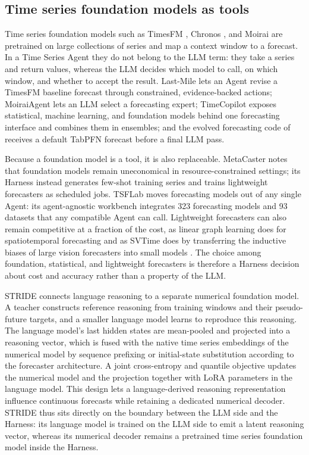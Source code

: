 \documentclass[preprints,article,submit,moreauthors]{Definitions/mdpi}
\begin{document}
\subsection{Time series foundation models as tools}
\label{sec:llm-tsfm}

Time series foundation models such as TimesFM \citep{das2024timesfm}, Chronos \citep{ansari2024chronos}, and Moirai \citep{woo2024moirai} are pretrained on large collections of series and map a context window to a forecast. In a Time Series Agent they do not belong to the LLM term: they take a series and return values, whereas the LLM decides which model to call, on which window, and whether to accept the result. Last-Mile \citep{lastmile2026} lets an Agent revise a TimesFM baseline forecast through constrained, evidence-backed actions; MoiraiAgent \citep{moiraiagent2026} lets an LLM select a forecasting expert; TimeCopilot \citep{timecopilot2025} exposes statistical, machine learning, and foundation models behind one forecasting interface and combines them in ensembles; and the evolved forecasting code of \citet{promptevolutionforecast2026} receives a default TabPFN forecast before a final LLM pass.

Because a foundation model is a tool, it is also replaceable. MetaCaster \citep{metacaster2026} notes that foundation models remain uneconomical in resource-constrained settings; its Harness instead generates few-shot training series and trains lightweight forecasters as scheduled jobs. TSFLab \citep{tsflab2026} moves forecasting models out of any single Agent: its agent-agnostic workbench integrates 323 forecasting models and 93 datasets that any compatible Agent can call. Lightweight forecasters can also remain competitive at a fraction of the cost, as linear graph learning does for spatiotemporal forecasting \citep{ma2025less} and as SVTime does by transferring the inductive biases of large vision forecasters into small models \citep{shen2025svtimesmalltimeseries}. The choice among foundation, statistical, and lightweight forecasters is therefore a Harness decision about cost and accuracy rather than a property of the LLM.

STRIDE \citep{stride2026} connects language reasoning to a separate numerical foundation model. A teacher constructs reference reasoning from training windows and their pseudo-future targets, and a smaller language model learns to reproduce this reasoning. The language model's last hidden states are mean-pooled and projected into a reasoning vector, which is fused with the native time series embeddings of the numerical model by sequence prefixing or initial-state substitution according to the forecaster architecture. A joint cross-entropy and quantile objective updates the numerical model and the projection together with LoRA parameters in the language model. This design lets a language-derived reasoning representation influence continuous forecasts while retaining a dedicated numerical decoder. STRIDE thus sits directly on the boundary between the LLM side and the Harness: its language model is trained on the LLM side to emit a latent reasoning vector, whereas its numerical decoder remains a pretrained time series foundation model inside the Harness.
\end{document}
